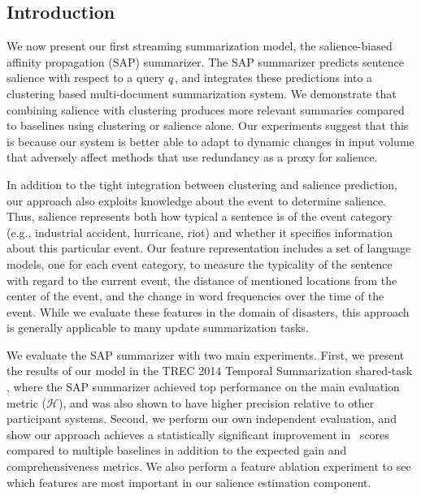 \subsection{Introduction}

We now present our first streaming summarization model, the salience-biased
affinity propagation (SAP) summarizer. The SAP summarizer predicts
sentence salience with respect to a query $q$, and integrates these
predictions into a clustering based multi-document summarization system. We
demonstrate that combining salience with clustering produces more relevant
summaries compared to baselines using clustering or salience alone.  Our
experiments suggest that this is because our system is better able to adapt to
dynamic changes in input volume that adversely affect methods that use
redundancy as a proxy for salience. 

In addition to the tight integration between clustering and salience
prediction, our approach also exploits knowledge about the event to determine
salience. Thus, salience represents both how typical a sentence is of the
event category (e.g., industrial accident, hurricane, riot) and whether it
specifies information about this particular event.  Our feature representation
includes a set of language models, one for each event category, to measure the
typicality of the sentence with regard to the current event, the distance of
mentioned locations from the center of the event, and the change in word
frequencies over the time of the event.  While we evaluate these features in
the domain of disasters, this approach is generally applicable to many update
summarization tasks.

We evaluate the SAP summarizer with two main experiments. First, we present 
the results of our model in the TREC 2014 Temporal
Summarization shared-task \citep{aslam2015}, where the SAP summarizer 
achieved top performance on the
main evaluation metric ($\mathcal{H}$), and was also shown to have higher
precision relative to other participant systems.  Second, we perform our own
independent evaluation, and show our approach achieves a statistically
significant improvement in \rouge~scores compared to multiple baselines
in addition to the expected gain and comprehensiveness metrics.
We also perform a feature ablation experiment to see which features
are most important in our salience estimation component.
%
%
